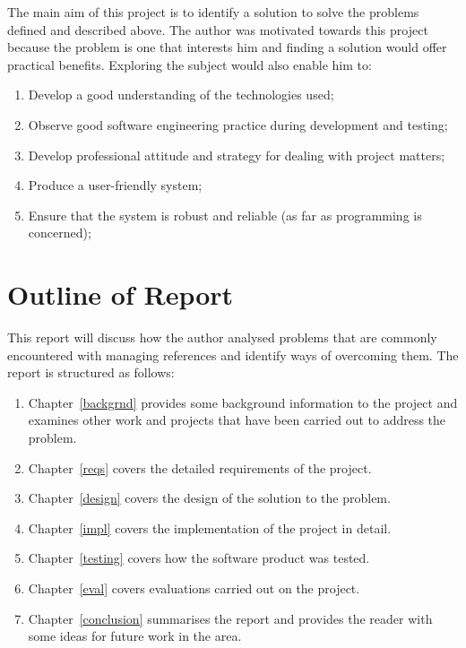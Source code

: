 The main aim of this project is to identify a solution to solve the problems defined and described above.  The author was motivated towards this project because the problem is one that interests him and finding a solution would offer practical benefits.  Exploring the subject would also enable him to:
\begin{enumerate}
	\item Develop a good understanding of the technologies used;
	\item Observe good software engineering practice during development and testing;
	\item Develop professional attitude and strategy for dealing with project matters;
	\item Produce a user-friendly system;
	\item Ensure that the system is robust and reliable (as far as programming is concerned);
\end{enumerate}


\section{Outline of Report}
This report will discuss how the author analysed problems that are commonly encountered with managing \bibtex{} references and identify ways of overcoming them.  The report is structured as follows: 
\begin{enumerate}
	\item Chapter~\ref{backgrnd} provides some background information to the project and examines other work and projects that have been carried out to address the problem.
	\item Chapter~\ref{reqs} covers the detailed requirements of the project.
	\item Chapter~\ref{design} covers the design of the solution to the problem.
	\item Chapter~\ref{impl} covers the implementation of the project in detail.
	\item Chapter~\ref{testing} covers how the software product was tested.
	\item Chapter~\ref{eval} covers evaluations carried out on the project.
	\item Chapter~\ref{conclusion} summarises the report and provides the reader with some ideas for future work in the area.
\end{enumerate}